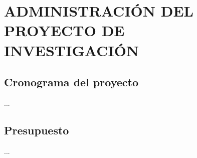 \chapter{ADMINISTRACIÓN DEL PROYECTO DE INVESTIGACIÓN }
\section{Cronograma del proyecto}
...
\section{Presupuesto}
...